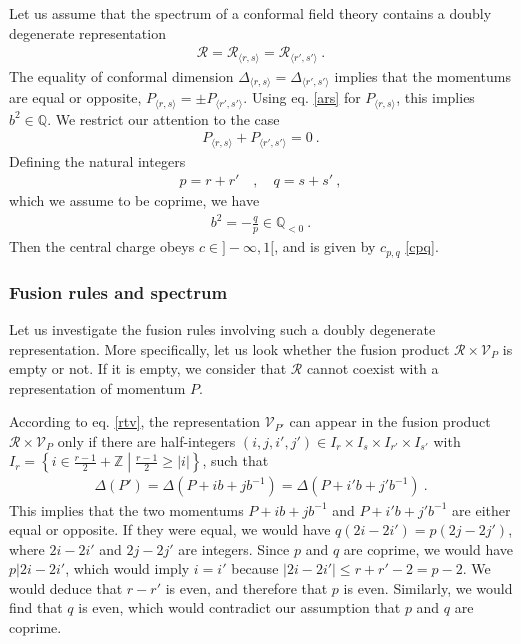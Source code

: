 \documentclass[12pt, a4paper, notitlepage, twoside]{report}
\numberwithin{equation}{section}
\theoremstyle{break}
\begin{document}
Let us assume that the spectrum of a conformal field theory contains a doubly degenerate representation 
\begin{align}
 \mathcal{R}=\mathcal{R}_{\langle r,s \rangle}=\mathcal{R}_{\langle r',s' \rangle}\ .
\end{align}
The equality of conformal dimension $\Delta_{\langle r,s \rangle}=\Delta_{\langle r',s' \rangle}$ implies that 
the momentums are equal or opposite, 
$P_{\langle r,s \rangle}=\pm P_{\langle r',s' \rangle}$. Using eq. \eqref{ars} for $P_{\langle r,s\rangle}$, this implies $b^2\in\mathbb{Q}$. We restrict our attention to the case 
\begin{align}
 P_{\langle r,s \rangle}+P_{\langle r',s' \rangle} = 0\ .
\end{align}
Defining the natural integers 
\begin{align}
 p = r+r' \quad , \quad q = s+s'\ ,
\end{align}
which we assume to be coprime, we have 
\begin{align} 
 \boxed{b^2 = - \frac{q}{p} \in \mathbb{Q}_{<0}} \ .
\end{align}
Then the central charge obeys $c\in ]-\infty, 1[$, and is given by $c_{p,q}$ \eqref{cpq}.

\subsubsection{Fusion rules and spectrum}

Let us investigate the fusion rules involving such a doubly degenerate representation. More specifically, let us look whether the fusion product $\mathcal{R}\times \mathcal{V}_P$ is empty or not. If it is empty, we consider that $\mathcal{R}$ cannot coexist with a representation of momentum $P$.

According to eq. \eqref{rtv}, the representation $\mathcal{V}_{P'} $ can appear in the fusion product $\mathcal{R}\times \mathcal{V}_P$ only if there are half-integers $(i,j,i',j')\in I_r\times I_s\times I_{r'}\times I_{s'}$ with $I_r=\left\{i\in \frac{r-1}{2}+\mathbb{Z}\middle| \frac{r-1}{2}\geq |i|\right\}$, such that  
\begin{align}
 \Delta(P') = \Delta\left(P+ ib+jb^{-1}\right) = \Delta\left(P+i'b+j'b^{-1}\right) \ .
 \label{dppdp}
\end{align}
This implies that the two momentums $P+ib+jb^{-1}$ and $ P+i'b+j'b^{-1}$ are either equal or opposite. If they were equal, we would have $q(2i-2i')=p(2j-2j')$, where $2i-2i'$ and $2j-2j'$ are integers. Since $p$ and $q$ are coprime, we would have $p|2i-2i'$, which would imply $i=i'$ because $|2i-2i'|\leq r+r'-2=p-2$. We would deduce that $r-r'$ is even, and therefore that $p$ is even. Similarly, we would find that $q$ is even, which would contradict our assumption that $p$ and $q$ are coprime.
\end{document}

